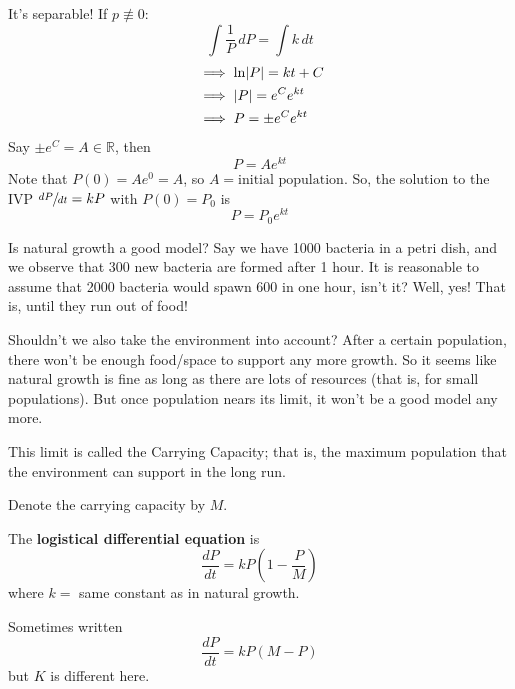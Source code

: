 It's separable! If $ p\not\equiv 0 $:
\[ \int \frac{1}{P} \, d{P}=\int k\, d{t}  \]
\begin{align*}
     & \implies \ln\lvert P\rvert=kt+C    \\
     & \implies \lvert P\rvert=e^C e^{kt} \\
     & \implies P=\pm e^{C}e^{kt}
\end{align*}
Say $ \pm e^C =A\in\mathbb{R} $, then
\[ P=Ae^{kt} \]
Note that $ P(0)=Ae^0=A $, so $ A=\text{initial population} $. So,
the solution to the IVP $ \sfrac{dP}{dt} =kP $ with $ P(0)=P_0 $ is
\[ P=P_0 e^{kt} \]

Is natural growth a good model? Say we have 1000 bacteria in a petri
dish, and we observe that 300 new bacteria are formed after 1 hour.
It is reasonable to assume that 2000 bacteria would spawn 600 in one hour,
isn't it? Well, yes! That is, until they run out of food!

Shouldn't we also take the environment into account? After
a certain population, there won't be enough food/space to
support any more growth. So it seems like natural growth is fine
as long as there are lots of resources (that is, for small populations).
But once population nears its limit, it won't be a good model any more.

This limit is called the Carrying Capacity; that is, the maximum population
that the environment can support in the long run.

Denote the carrying capacity by $ M $.

\begin{Definition}{}{}
    The \textbf{logistical differential equation} is
    \[ \frac{dP}{dt}=kP\left( 1-\frac{P}{M}  \right) \]
    where $ k =$ same constant as in natural growth.
\end{Definition}
\begin{Remark}{}{}
    Sometimes written
    \[ \frac{dP}{dt}=kP(M-P)  \]
    but $ K $ is different here.
\end{Remark}

